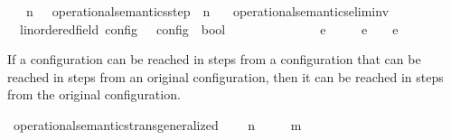 \begin{isabellebody}
\isanewline
\ \ {\isacartoucheopen}{\isasymC}\ {\isasymhookrightarrow}\isactrlbsup n\isactrlesup \ {\isasymC}\ {\isasymequiv}\ {\isacharparenleft}operational{\isacharunderscore}semantics{\isacharunderscore}step\ {\isacharcircum}{\isacharcircum}\ n{\isacharparenright}\ {\isasymC}\ {\isasymC}\isanewline
\isanewline
{}\isamarkupfalse%
\ operational{\isacharunderscore}semantics{\isacharunderscore}elim{\isacharunderscore}inv\isanewline
\ \ {\isacharcolon}{\isacharcolon}{\isacartoucheopen}{\isacharparenleft}{\isacharprime}{\isasymtau}{\isacharcolon}{\isacharcolon}linordered{\isacharunderscore}field{\isacharparenright}\ config\ {\isasymRightarrow}\ {\isacharprime}{\isasymtau}\ config\ {\isasymRightarrow}\ bool{\isacartoucheclose}\ \ \ \ \ \ \ \ \ \ \ \ \ \ {\isacharparenleft}{\isacartoucheopen}{\isacharunderscore}\ {\isasymhookrightarrow}\isactrlsub e\isactrlsup {\isasymleftarrow}\ {\isacharunderscore}{\isacartoucheclose}\ {}{}{\isacharparenright}\isanewline
{}\isanewline
\ \ {\isacartoucheopen}{\isasymC}\ {\isasymhookrightarrow}\isactrlsub e\isactrlsup {\isasymleftarrow}\ {\isasymC}\ {\isasymequiv}\ {\isasymC}\ {\isasymhookrightarrow}\isactrlsub e\ {\isasymC}%
\isadelimdocument
%
\endisadelimdocument
%
\isatagdocument
%
\isamarkuptrue%
%
\endisatagdocument
{\isafolddocument}%
%
\isadelimdocument
%
\endisadelimdocument
%
\begin{isamarkuptext}%
If a configuration can be reached in  steps from a configuration that 
  can be reached in  steps from an original configuration, then it can be 
  reached in  steps from the original configuration.%
\end{isamarkuptext}\isamarkuptrue%
\isamarkupfalse%
\ operational{\isacharunderscore}semantics{\isacharunderscore}trans{\isacharunderscore}generalized{\isacharcolon}\isanewline
\ \ \ {\isacartoucheopen}{\isasymC}\ {\isasymhookrightarrow}\isactrlbsup n\isactrlesup \ {\isasymC}\isanewline
\ \ \ {\isacartoucheopen}{\isasymC}\ {\isasymhookrightarrow}\isactrlbsup m\isactrlesup \ {\isasymC}\isanewline

\end{isabellebody}
